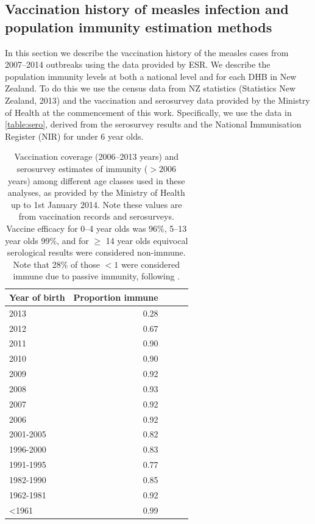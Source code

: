 \documentclass{article}
\begin{document}
\subsection{Vaccination history of measles infection and population immunity estimation methods}
\label{sub:immunestat}

In this section we describe the vaccination history of the measles cases from 2007--2014 outbreaks using the data provided by ESR. We describe the population immunity levels at both a national level and for each DHB in New Zealand. To do this we use the census data from NZ statistics (Statistics New Zealand, 2013) and the vaccination and serosurvey data provided by the Ministry of Health at the commencement of this work. Specifically, we use the data in \autoref{table:sero}, derived from the serosurvey results and the National Immunisation Register (NIR) for under 6 year olds.

\begin{table}[htdp]
\begin{center}
\begin{tabular}{lrrrr}
\hline
Year of birth &  Proportion immune\\
\hline
2013 & 0.28 \\
2012 & 0.67 \\
2011 & 0.90 \\
2010 & 0.90 \\
2009 & 0.92 \\
2008 & 0.93 \\
2007 & 0.92 \\
2006 & 0.92 \\
2001-2005 & 0.82 \\
1996-2000 & 0.83 \\
1991-1995 & 0.77 \\
1982-1990 & 0.85 \\
1962-1981 & 0.92 \\
<1961 & 0.99 \\
\hline
\end{tabular}
\end{center}
\caption{Vaccination coverage (2006--2013 years) and serosurvey estimates of immunity ($>2006$ years) among different age classes used in these analyses, as provided by the Ministry of Health up to 1st January 2014. Note these values are from vaccination records and serosurveys. Vaccine efficacy for 0--4 year olds was 96\%, 5--13 year olds 99\%, and for $\geq$ 14 year olds equivocal serological results were considered non-immune. Note that 28\% of those $<1$ were considered immune due to passive immunity, following \citep{waaijenborg}.}
\label{table:sero}
\end{table}%
\end{document}
